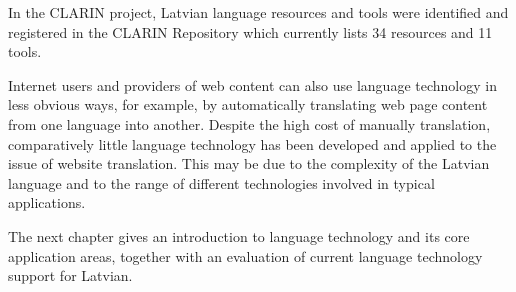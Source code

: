 \begin{multicols}{2}
In the CLARIN project, Latvian language resources and tools were identified and registered in the CLARIN Repository \cite{Meta14} which currently lists 34 resources and 11 tools.

Internet users and providers of web content can also use language technology in less obvious ways, for example, by automatically translating web page content from one language into another.
Despite the high cost of manually translation, comparatively little language technology has been developed and applied to the issue of website translation.
This may be due to the complexity of the Latvian language and to the range of different technologies involved in typical applications.

The next chapter gives an introduction to language technology and its core application areas, together with an evaluation of current language technology support for Latvian.

\end{multicols}

\clearpage


